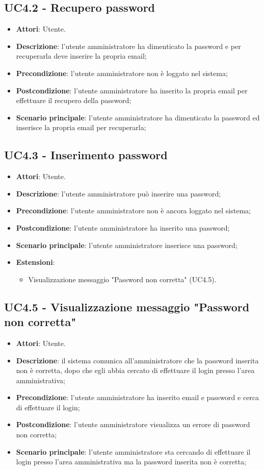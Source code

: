 \documentclass[../AnalisiDeiRequisiti_v4.0.0.tex]{subfiles}
\begin{document}
\subsection{UC4.2 - Recupero password} 
\label{sssec:UC4.2} 
\begin{itemize} 
\item \textbf{Attori}: Utente.
\item \textbf{Descrizione}: l'utente amministratore ha dimenticato la password e per recuperarla deve inserire la propria email;
\item \textbf{Precondizione}: l'utente amministratore non è loggato nel sistema;
\item \textbf{Postcondizione}: l'utente amministratore ha inserito la propria email per effettuare il recupero della password;
\item \textbf{Scenario principale}: l'utente amministratore ha dimenticato la password ed inserisce la propria email per recuperarla;
\end{itemize} 
\subsection{UC4.3 - Inserimento password} 
\label{sssec:UC4.3} 
\begin{itemize} 
\item \textbf{Attori}: Utente.
\item \textbf{Descrizione}: l'utente amministratore può inserire una password;
\item \textbf{Precondizione}: l'utente amministratore non è ancora loggato nel sistema;
\item \textbf{Postcondizione}: l'utente amministratore ha inserito una password;
\item \textbf{Scenario principale}: l'utente amministratore inserisce una password;
\item \textbf{Estensioni}:\begin{itemize}\item Visualizzazione messaggio "Password non corretta" (UC4.5).\end{itemize}
\end{itemize} 
\subsection{UC4.5 - Visualizzazione messaggio "Password non corretta"} 
\label{sssec:UC4.5} 
\begin{itemize} 
\item \textbf{Attori}: Utente.
\item \textbf{Descrizione}: il sistema comunica all'amministratore che la password inserita non è corretta, dopo che egli abbia cercato di effettuare il login presso l'area amministrativa;
\item \textbf{Precondizione}: l'utente amministratore ha inserito email e password e cerca di effettuare il login;
\item \textbf{Postcondizione}: l'utente amministratore visualizza un errore di password non corretta;
\item \textbf{Scenario principale}: l'utente amministratore sta cercando di effettuare il login presso l'area amministrativa ma la password inserita non è corretta;
\end{itemize} 
\end{document}
